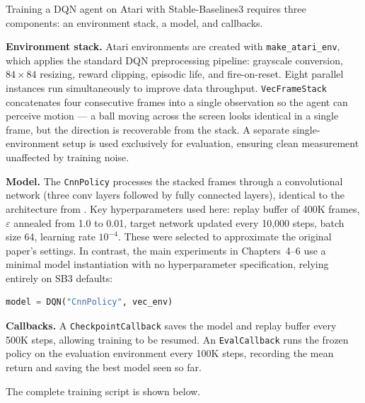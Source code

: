 {\color{red}
Training a DQN agent on Atari with Stable-Baselines3 \citep{raffin2021sb3} requires three components: an environment stack, a model, and callbacks.

\textbf{Environment stack.}
Atari environments are created with \texttt{make\_atari\_env}, which applies the standard DQN preprocessing pipeline: grayscale conversion, $84\times84$ resizing, reward clipping, episodic life, and fire-on-reset. Eight parallel instances run simultaneously to improve data throughput. \texttt{VecFrameStack} concatenates four consecutive frames into a single observation so the agent can perceive motion --- a ball moving across the screen looks identical in a single frame, but the direction is recoverable from the stack. A separate single-environment setup is used exclusively for evaluation, ensuring clean measurement unaffected by training noise.

\textbf{Model.}
The \texttt{CnnPolicy} processes the stacked frames through a convolutional network (three conv layers followed by fully connected layers), identical to the architecture from \citet{mnih2015human}. Key hyperparameters used here: replay buffer of 400K frames, $\varepsilon$ annealed from 1.0 to 0.01, target network updated every 10,000 steps, batch size 64, learning rate $10^{-4}$. These were selected to approximate the original paper's settings. In contrast, the main experiments in Chapters~4--6 use a minimal model instantiation with no hyperparameter specification, relying entirely on SB3 defaults:
\begin{lstlisting}[language=Python, basicstyle=\small\ttfamily, frame=none]
model = DQN("CnnPolicy", vec_env)
\end{lstlisting}

\textbf{Callbacks.}
A \texttt{CheckpointCallback} saves the model and replay buffer every 500K steps, allowing training to be resumed. An \texttt{EvalCallback} runs the frozen policy on the evaluation environment every 100K steps, recording the mean return and saving the best model seen so far.

The complete training script is shown below.
}

